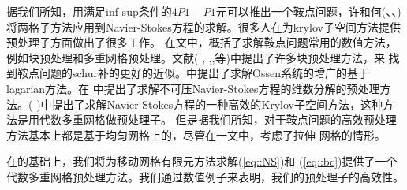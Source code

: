     据我们所知，用满足inf-sup条件的$4P1-P1$元可以推出一个鞍点问题，许和何(\cite{xu1992iterative}、\cite{shen1999schur}、\cite{he2003})
    将两格子方法应用到Navier-Stokes方程的求解。很多人在为krylov子空间方法提供预处理子方面做出了很多工作。
    在\cite{benzi2005numerical}文中，概括了求解鞍点问题常用的数值方法，例如块预处理和多重网格预处理。文献(
    \cite{bai2005inexact}, \cite{bai2006structured},\cite{elman2007least},\cite{elman2009boundary}等)中提出了许多块预处理方法，来
    找到鞍点问题的schur补的更好的近似。\cite{benzi2006augmented}中提出了求解Ossen系统的增广的基于lagarian方法。在\cite{benzi2011relaxed}
    中提出了求解不可压Navier-Stokes方程的维数分解的预处理方法。(\cite{boyle2007hsl}
    \cite{boyle2010hsl_mi20})中提出了求解Navier-Stokes方程的一种高效的Krylov子空间方法，这种方法是用代数多重网格做预处理子。
    但是据我们所知，对于鞍点问题的高效预处理方法基本上都是基于均匀网格上的，尽管在\cite{benzi2011relaxed}一文中，考虑了拉伸
    网格的情形。

    在\cite{elman2005finite}的基础上，我们将为移动网格有限元方法求解(\ref{eq::NS})和
    (\ref{eq::bc})提供了一个代数多重网格预处理方法。我们通过数值例子来表明，我们的预处理子的高效性。
